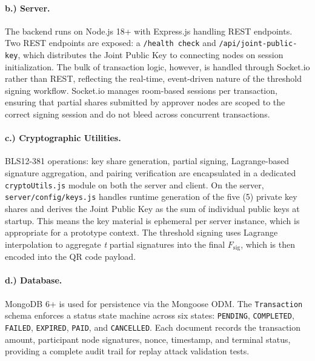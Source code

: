 \documentclass[a4paper]{scl-article}
\begin{document}
\paragraph{b.) Server.}
The backend runs on Node.js 18+ with Express.js handling REST endpoints. Two REST endpoints are exposed: a \texttt{/health check} and \texttt{/api/joint-public-key}, which distributes the Joint Public Key to connecting nodes on session initialization. The bulk of transaction logic, however, is handled through Socket.io rather than REST, reflecting the real-time, event-driven nature of the threshold signing workflow. Socket.io manages room-based sessions per transaction, ensuring that partial shares submitted by approver nodes are scoped to the correct signing session and do not bleed across concurrent transactions.


\paragraph{c.) Cryptographic Utilities.}
BLS12-381 operations: key share generation, partial signing, Lagrange-based signature aggregation, and pairing verification are encapsulated in a dedicated \texttt{cryptoUtils.js} module on both the server and client. On the server, \texttt{server/config/keys.js} handles runtime generation of the five (5) private key shares and derives the Joint Public Key as the sum of individual public keys at startup. This means the key material is ephemeral per server instance, which is appropriate for a prototype context. The threshold signing uses Lagrange interpolation to aggregate \textit{t} partial signatures into the final  $F_{\text{sig}}$, which is then encoded into the QR code payload.



\paragraph{d.) Database.}
MongoDB 6+ is used for persistence via the Mongoose ODM. The \texttt{Transaction} schema enforces a status state machine across six states: \texttt{PENDING}, \texttt{COMPLETED}, \texttt{FAILED}, \texttt{EXPIRED}, \texttt{PAID}, and \texttt{CANCELLED}. Each document records the transaction amount, participant node signatures, nonce, timestamp, and terminal status, providing a complete audit trail for replay attack validation tests.



%
\end{document}
